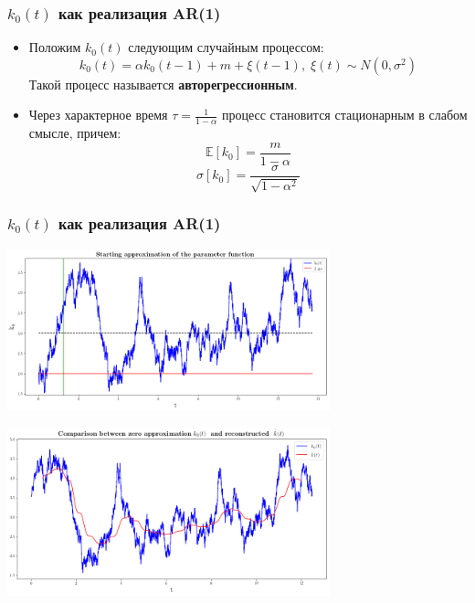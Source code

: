\documentclass{beamer}
\begin{document}
\begin{frame}
	\frametitle{$k_0(t)$ как реализация AR(1)}
	\begin{itemize}
		\item 	Положим $k_0(t)$ следующим случайным процессом:
		\[
		k_0(t)=\alpha k_0(t-1)+m+\xi(t-1),\;\xi(t)\sim N(0, \sigma^2)
		\]
		Такой процесс называется \textbf{авторегрессионным}.
		\item Через характерное время $\tau=\frac{1}{1-\alpha}$ процесс становится стационарным в слабом смысле, причем:
		\[\mathbb{E}[k_0]=\frac{m}{1-\alpha}\]
		\[
		\sigma[k_0]=\frac{\sigma}{\sqrt{1-\alpha^2}}
		\]
	\end{itemize}
\end{frame}

\begin{frame}
\frametitle{$k_0(t)$ как реализация AR(1)}
\phantom{123}
\begin{center}
	\includegraphics[width=0.7\textwidth]{stk1.png} 
	
	\includegraphics[width=0.7\textwidth]{stk1-1.png}
\end{center}
\end{frame}
\end{document}
